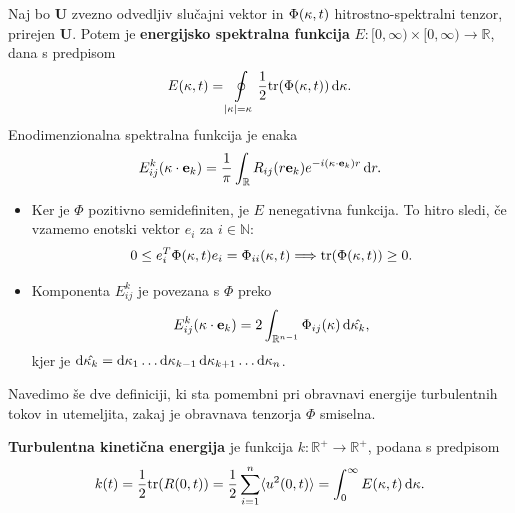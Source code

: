 \documentclass[mat2, tisk]{fmfdelo}
\newcommand{\R}{\mathbb R}
\newcommand{\N}{\mathbb N}
\newcommand{\bd}{\textbf}
\begin{document}
\begin{definicija}
Naj bo $\bd{U}$ zvezno odvedljiv slučajni vektor in $\Phi(\text{\bd{$\kappa$}}, t)$ 
hitrostno-spektralni tenzor, prirejen $\bd{U}$. Potem je \bd{energijsko spektralna funkcija} $E: [0, \infty) \times [0, \infty) \rightarrow \R$, dana
s predpisom
\begin{equation*}
E(\kappa, t) = \oint\limits_{|\text{\bd{$\kappa$}}| = \kappa} \frac{1}{2} \text{tr}(\Phi(\text{\bd{$\kappa$}}, t)) \dif \text{\bd{$\kappa$}}.
\end{equation*}
Enodimenzionalna spektralna funkcija je enaka 
\begin{equation*}
E_{ij}^k (\bd{\text{$\kappa$}} \cdot \bd{e}_k) = \frac{1}{\pi} \int_\R R_{ij}(r\bd{e}_k) e^{-i(\bd{\text{$\kappa$}} \cdot \bd{e}_k)r} \dif r.
\end{equation*}
\end{definicija}

\begin{opomba}
  \hfill
\begin{itemize}
\item Ker je $\Phi$ pozitivno semidefiniten, je $E$ nenegativna funkcija. To hitro sledi, če vzamemo 
enotski vektor $e_i$ za $i\in \N$:
$$
0 \leq e^T_i \Phi(\text{\bd{$\kappa$}}, t) e_i = \Phi_{ii}(\text{\bd{$\kappa$}}, t) \Longrightarrow \text{tr}(\Phi(\text{\bd{$\kappa$}}, t)) \geq 0.
$$
\item Komponenta $E_{ij}^k$ je povezana s $\Phi$ preko 
$$
E^k_{ij}(\bd{\text{$\kappa$}} \cdot \bd{e}_k) = 2 \int_{\R^{n-1}} \Phi_{ij}(\bd{\text{$\kappa$}}) \dif \hat{\bd{\text{$\kappa$}}_k},
$$
kjer je $ \dif \hat{\bd{\text{$\kappa$}}_k} = \dif \kappa_1 \dots \dif \kappa_{k-1} \dif \kappa_{k+1} \dots \dif \kappa_{n}$.
\end{itemize}
\end{opomba}

Navedimo še dve definiciji, ki sta pomembni pri obravnavi energije 
turbulentnih tokov in utemeljita, zakaj je obravnava tenzorja $\Phi$ smiselna.

\begin{definicija}
\textbf{Turbulentna kinetična energija} je funkcija $k:\R^+ \rightarrow \R^+$, podana s predpisom
\begin{equation*}
k(t) = \frac{1}{2} \text{tr}(R(0, t)) = \frac{1}{2} \sum_{i=1}^{n} \langle u^2(0, t) \rangle = \int_{0}^\infty E(\kappa, t) \dif \kappa.
\end{equation*}
\end{definicija}
\end{document}

